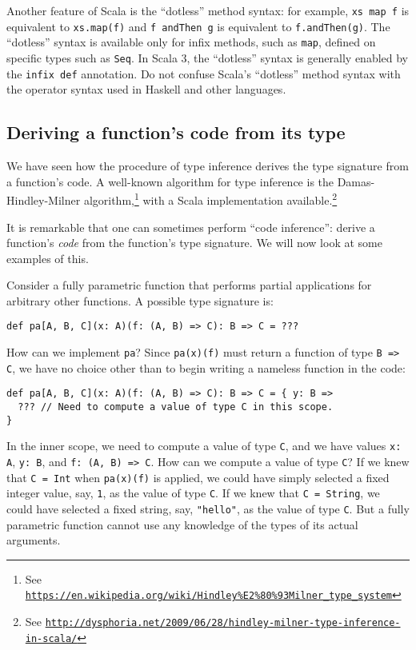 Another feature of Scala is the \textsf{``}dotless\textsf{''} method syntax: for example,
\lstinline!xs map f! is equivalent to \lstinline!xs.map(f)! and
\lstinline!f andThen g! is equivalent to \lstinline!f.andThen(g)!.
The \textsf{``}dotless\textsf{''} syntax is available only for infix methods, such
as \lstinline!map!, defined on specific types such as \lstinline!Seq!.
In Scala 3, the \textsf{``}dotless\textsf{''} syntax is generally enabled by the \lstinline!infix def!
annotation. Do not confuse Scala\textsf{'}s \textsf{``}dotless\textsf{''} method syntax with
the operator syntax used in Haskell and other languages.

\subsection{Deriving a function\textsf{'}s code from its type\label{subsec:Deriving-a-function-s-code}}

We have seen how the procedure of type inference
derives the type signature from a function\textsf{'}s code. A well-known algorithm
for type inference is the Damas-Hindley-Milner algorithm,\footnote{See \texttt{\href{https://en.wikipedia.org/wiki/Hindley\%E2\%80\%93Milner_type_system}{https://en.wikipedia.org/wiki/Hindley\%E2\%80\%93Milner\_type\_system}}}
with a Scala implementation available.\footnote{See \texttt{\href{http://dysphoria.net/2009/06/28/hindley-milner-type-inference-in-scala/}{http://dysphoria.net/2009/06/28/hindley-milner-type-inference-in-scala/}}}

It is remarkable that one can sometimes perform \textsf{``}code
inference\textsf{''}: derive a function\textsf{'}s \emph{code} from the function\textsf{'}s
type signature. We will now look at some examples of this.

Consider a fully parametric function that performs partial applications
for arbitrary other functions. A possible type signature is:
\begin{lstlisting}
def pa[A, B, C](x: A)(f: (A, B) => C): B => C = ???
\end{lstlisting}

How can we implement \lstinline!pa!? Since \lstinline!pa(x)(f)!
must return a function of type \lstinline!B => C!, we have no choice
other than to begin writing a nameless function in the code:
\begin{lstlisting}
def pa[A, B, C](x: A)(f: (A, B) => C): B => C = { y: B =>
  ??? // Need to compute a value of type C in this scope.
}
\end{lstlisting}
In the inner scope, we need to compute a value of type \lstinline!C!,
and we have values \lstinline!x: A!, \lstinline!y: B!, and \lstinline!f: (A, B) => C!.
How can we compute a value of type \lstinline!C!? If we knew that
\lstinline!C = Int! when \lstinline!pa(x)(f)! is applied, we could
have simply selected a fixed integer value, say, \lstinline!1!, as
the value of type \lstinline!C!. If we knew that \lstinline!C = String!,
we could have selected a fixed string, say, \lstinline!"hello"!,
as the value of type \lstinline!C!. But a fully parametric function
cannot use any knowledge of the types of its actual arguments.

